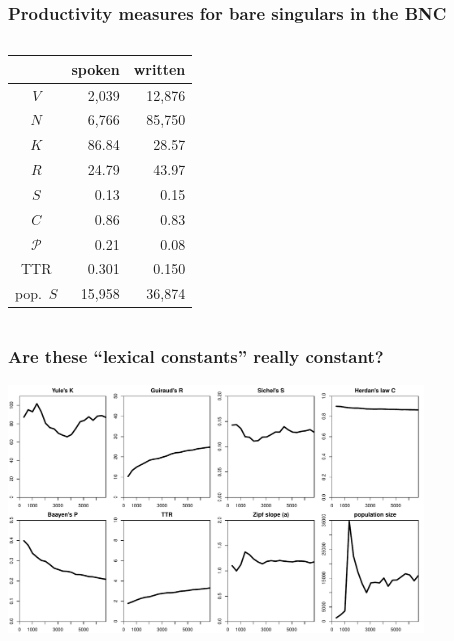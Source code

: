 \documentclass[handout,notes=show,t]{beamer} %
\begin{document}
\begin{frame}[c]
  \frametitle{Productivity measures for bare singulars in the BNC}

  \begin{columns}[c]
    \begin{column}{6cm}
      \centering
      \begin{tabular}{c@{$\qquad$}r@{$\qquad$}r}
        \toprule
        &    spoken &   written \\
        \midrule
        $V$     &  2,039 & 12,876 \\
        $N$     &  6,766 & 85,750 \\
        \midrule
        $K$     &    86.84 &    28.57 \\
        $R$     &    24.79 &    43.97 \\
        $S$     &     0.13 &     0.15 \\
        $C$     &     0.86 &     0.83 \\
        $\mathcal{P}$     &     0.21 &     0.08 \\
        TTR   &     0.301 &     0.150 \\
        pop.\ $S$ & 15,958 & 36,874 \\
        \bottomrule
      \end{tabular}
    \end{column}
    \begin{column}{6cm}
    \end{column}
  \end{columns}
\end{frame}

\begin{frame}[c]
  \frametitle{Are these ``lexical constants'' really constant?}

  \centering
  \includegraphics[width=11cm]{img/bare_bncS_obs_lexical_constants}
\end{frame}
\end{document}
